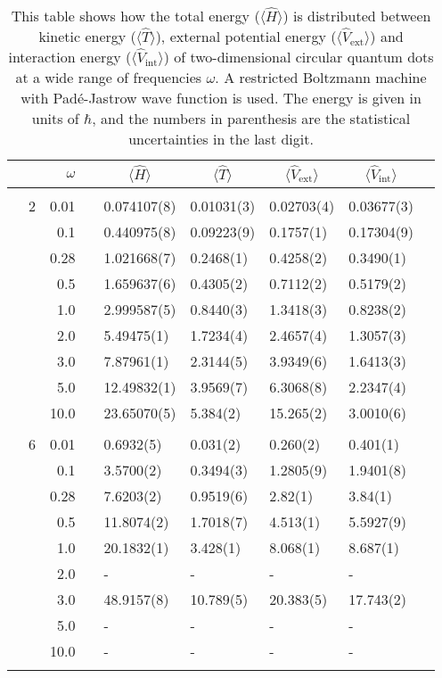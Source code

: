 \begin{table}[H]
	\caption{This table shows how the total energy ($\langle\hat{H}\rangle$) is distributed between kinetic energy ($\langle\hat{T}\rangle$), external potential energy ($\langle\hat{V}_{\text{ext}}\rangle$) and interaction energy ($\langle\hat{V}_{\text{int}}\rangle$) of two-dimensional circular quantum dots at a wide range of frequencies $\omega$. A restricted Boltzmann machine with Padé-Jastrow wave function is used. The energy is given in units of $\hbar$, and the numbers in parenthesis are the statistical uncertainties in the last digit.}
	\label{tab:splitfrequencyQDRBMPJ}
	\begin{tabularx}{\textwidth}{R{1cm}rrcR{2.3cm}R{2.3cm}R{2.3cm}R{2.3cm}R{1cm}} \hline\hline
		&\makecell{\\ \phantom{$N$} \\ \phantom{=}} & $\omega$ &&  &  &  &  & \\ \hline \\
		&2 & 0.01 && 0.074107(8) & 0.01031(3) & 0.02703(4) & 0.03677(3) \\
		&& 0.1 && 0.440975(8) & 0.09223(9) & 0.1757(1) & 0.17304(9) \\
		&& 0.28 && 1.021668(7) & 0.2468(1) & 0.4258(2) & 0.3490(1) \\
		&& 0.5 && 1.659637(6) & 0.4305(2) & 0.7112(2) & 0.5179(2) \\
		&& 1.0 && 2.999587(5) & 0.8440(3) & 1.3418(3) & 0.8238(2) \\
		&& 2.0 && 5.49475(1) & 1.7234(4) & 2.4657(4) & 1.3057(3) \\
		&& 3.0 && 7.87961(1) & 2.3144(5) & 3.9349(6) & 1.6413(3) \\
		&& 5.0 && 12.49832(1) & 3.9569(7) & 6.3068(8) & 2.2347(4) \\
		&& 10.0 && 23.65070(5) & 5.384(2) & 15.265(2) & 3.0010(6) \\
		\hdashline \\
		
		&6 & 0.01 && 0.6932(5) & 0.031(2) & 0.260(2) & 0.401(1) \\
		&& 0.1 && 3.5700(2) & 0.3494(3) & 1.2805(9) & 1.9401(8) \\
		&& 0.28 && 7.6203(2) & 0.9519(6) & 2.82(1) & 3.84(1) \\
		&& 0.5 && 11.8074(2) & 1.7018(7) & 4.513(1) & 5.5927(9) \\
		&& 1.0 && 20.1832(1) & 3.428(1) & 8.068(1) & 8.687(1) \\
		&& 2.0 && - & - & - & -\\
		&& 3.0 && 48.9157(8) & 10.789(5) & 20.383(5) & 17.743(2) \\ 
		&& 5.0 && - & - & - & -\\
		&& 10.0 && - & - & - & -\\
		\hdashline \\
		

\end{tabularx}
\end{table}
